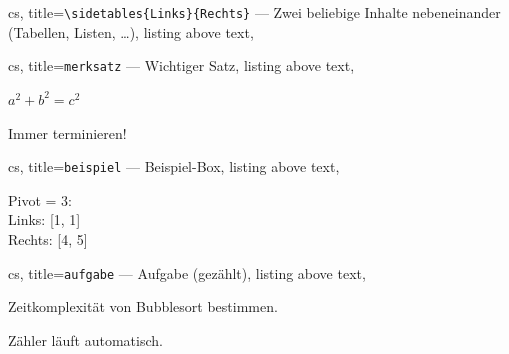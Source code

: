 \documentclass[a4paper, 11pt, ngerman]{article}
\begin{document}
\vspace{0.45em}

\begin{tcblisting}{cs,
  title={\texttt{\textbackslash sidetables\{Links\}\{Rechts\}} — Zwei beliebige Inhalte nebeneinander (Tabellen, Listen, …)},
  listing above text,
}
\end{tcblisting}

\noindent
\begin{minipage}[t]{0.318\linewidth}
\begin{tcblisting}{cs,
  title={\texttt{merksatz} — Wichtiger Satz},
  listing above text,
}
\begin{merksatz}[Satz]
  $a^2 + b^2 = c^2$
\end{merksatz}
\begin{merksatz}
  Immer terminieren!
\end{merksatz}
\end{tcblisting}
\end{minipage}%
\hfill
\begin{minipage}[t]{0.318\linewidth}
\begin{tcblisting}{cs,
  title={\texttt{beispiel} — Beispiel-Box},
  listing above text,
}
\begin{beispiel}[Quicksort]
  Pivot = 3:\\
  Links: [1, 1]\\
  Rechts: [4, 5]
\end{beispiel}
\end{tcblisting}
\end{minipage}%
\hfill
\begin{minipage}[t]{0.318\linewidth}
\begin{tcblisting}{cs,
  title={\texttt{aufgabe} — Aufgabe (gezählt)},
  listing above text,
}
\begin{aufgabe}[Analyse]
  Zeitkomplexität von
  Bubblesort bestimmen.
\end{aufgabe}
\begin{aufgabe}
  Zähler läuft automatisch.
\end{aufgabe}
\end{tcblisting}
\end{minipage}
\end{document}
